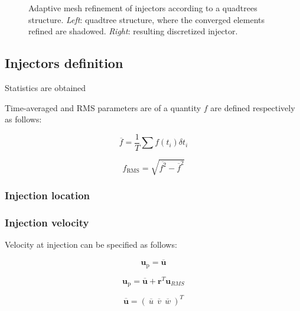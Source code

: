 \begin{figure}[h!]	
	\centering
	\caption[Adaptive mesh refinement of injectors according to a quadtrees structure]{Adaptive mesh refinement of injectors according to a quadtrees structure. \textsl{Left}: quadtree structure, where the converged elements refined are shadowed. \textsl{Right}: resulting discretized injector. }
	\label{fig:quadtrees_tree_structure}
\end{figure}



\subsection{Injectors definition}

Statistics are obtained 

Time-averaged  and RMS parameters are of a quantity $f$ are defined respectively as follows:

\begin{equation}
\overline{f} = \frac{1}{T} \sum f \left( t_i \right) \delta t_i
\end{equation}

\begin{equation}
f_\mathrm{RMS} = \sqrt{\overline{f^2} - \overline{f}^2}
\end{equation}



\subsubsection*{Injection location}

\subsubsection*{Injection velocity}

Velocity at injection can be specified as follows:

\begin{equation}
\boldsymbol{u}_\mathrm{p} = \overline{\boldsymbol{u}} 
\end{equation}


\begin{equation}
\boldsymbol{u}_\mathrm{p} = \overline{\boldsymbol{u}} + \boldsymbol{r}^T \boldsymbol{u}_{RMS}
\end{equation}

\begin{equation}
 \overline{\boldsymbol{u}} = \left( ~ \overline{u} ~~ \overline{v} ~~ \overline{w} ~ \right)^T
\end{equation}

